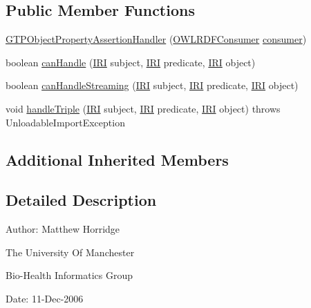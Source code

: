 \subsection*{Public Member Functions}
\begin{DoxyCompactItemize}
\item 
\hyperlink{classorg_1_1coode_1_1owlapi_1_1rdfxml_1_1parser_1_1_g_t_p_object_property_assertion_handler_a6312ed929a349ebe43c989088fb43004}{G\-T\-P\-Object\-Property\-Assertion\-Handler} (\hyperlink{classorg_1_1coode_1_1owlapi_1_1rdfxml_1_1parser_1_1_o_w_l_r_d_f_consumer}{O\-W\-L\-R\-D\-F\-Consumer} \hyperlink{classorg_1_1coode_1_1owlapi_1_1rdfxml_1_1parser_1_1_abstract_triple_handler_a4ccf4d898ff01eb1cadfa04b23d54e9c}{consumer})
\item 
boolean \hyperlink{classorg_1_1coode_1_1owlapi_1_1rdfxml_1_1parser_1_1_g_t_p_object_property_assertion_handler_ada283fa31b9a5933cb5532420c7348ae}{can\-Handle} (\hyperlink{classorg_1_1semanticweb_1_1owlapi_1_1model_1_1_i_r_i}{I\-R\-I} subject, \hyperlink{classorg_1_1semanticweb_1_1owlapi_1_1model_1_1_i_r_i}{I\-R\-I} predicate, \hyperlink{classorg_1_1semanticweb_1_1owlapi_1_1model_1_1_i_r_i}{I\-R\-I} object)
\item 
boolean \hyperlink{classorg_1_1coode_1_1owlapi_1_1rdfxml_1_1parser_1_1_g_t_p_object_property_assertion_handler_ade02bfe121e9431f6f8266d993826cb9}{can\-Handle\-Streaming} (\hyperlink{classorg_1_1semanticweb_1_1owlapi_1_1model_1_1_i_r_i}{I\-R\-I} subject, \hyperlink{classorg_1_1semanticweb_1_1owlapi_1_1model_1_1_i_r_i}{I\-R\-I} predicate, \hyperlink{classorg_1_1semanticweb_1_1owlapi_1_1model_1_1_i_r_i}{I\-R\-I} object)
\item 
void \hyperlink{classorg_1_1coode_1_1owlapi_1_1rdfxml_1_1parser_1_1_g_t_p_object_property_assertion_handler_a18796ad5ab2c966e3c24ea8519ec3dcf}{handle\-Triple} (\hyperlink{classorg_1_1semanticweb_1_1owlapi_1_1model_1_1_i_r_i}{I\-R\-I} subject, \hyperlink{classorg_1_1semanticweb_1_1owlapi_1_1model_1_1_i_r_i}{I\-R\-I} predicate, \hyperlink{classorg_1_1semanticweb_1_1owlapi_1_1model_1_1_i_r_i}{I\-R\-I} object)  throws Unloadable\-Import\-Exception 
\end{DoxyCompactItemize}
\subsection*{Additional Inherited Members}


\subsection{Detailed Description}
Author\-: Matthew Horridge\par
 The University Of Manchester\par
 Bio-\/\-Health Informatics Group\par
 Date\-: 11-\/\-Dec-\/2006\par
\par
 

